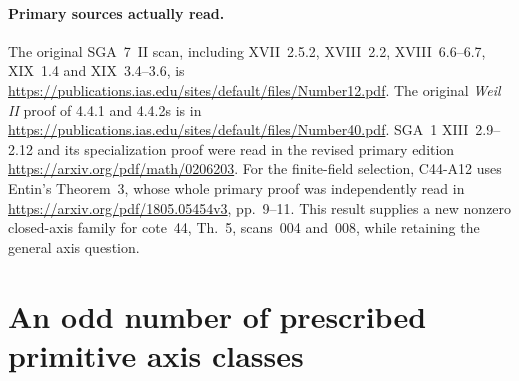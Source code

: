 \documentclass[11pt]{article}
\theoremstyle{remark}\newtheorem{remark}[theorem]{Remark}
\begin{document}
\paragraph{Primary sources actually read.}
The original SGA~7~II scan, including XVII~2.5.2,
XVIII~2.2, XVIII~6.6--6.7, XIX~1.4 and XIX~3.4--3.6, is
\url{https://publications.ias.edu/sites/default/files/Number12.pdf}.
The original \emph{Weil II} proof of 4.4.1 and 4.4.2s is in
\url{https://publications.ias.edu/sites/default/files/Number40.pdf}.
SGA~1 XIII~2.9--2.12 and its specialization proof were read in
the revised primary edition
\url{https://arxiv.org/pdf/math/0206203}.
For the finite-field selection, C44-A12 uses Entin's Theorem~3,
whose whole primary proof was independently read in
\url{https://arxiv.org/pdf/1805.05454v3}, pp.~9--11.
This result supplies a new nonzero closed-axis family for cote~44,
Th.~5, scans~004 and~008, while retaining the general axis question.


\section{An odd number of prescribed primitive axis classes}
\label{sec:c44-a13b}
\end{document}
